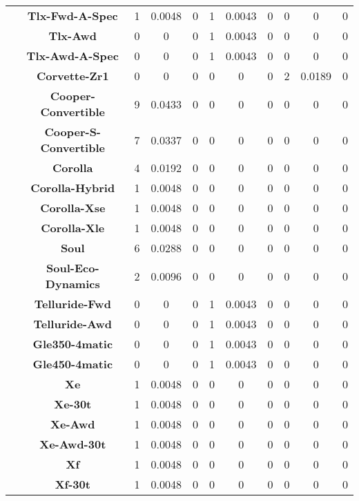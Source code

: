 \begin{center}
\begin{tabular}{|c|c||@{\hspace{1ex}}||c|c|c||@{\hspace{1ex}}||c|c|c||@{\hspace{1ex}}||c|c|c||@{\hspace{1ex}}||}
\cline{2-11}
  & {\bf Tlx-Fwd-A-Spec} & 1 & 0.0048 & 0 & 1 & 0.0043 & 0 & 0 & 0 & 0 \\
\cline{2-11}
  & {\bf Tlx-Awd} & 0 & 0 & 0 & 1 & 0.0043 & 0 & 0 & 0 & 0 \\
\cline{2-11}
  & {\bf Tlx-Awd-A-Spec} & 0 & 0 & 0 & 1 & 0.0043 & 0 & 0 & 0 & 0 \\
\cline{2-11}
  & {\bf Corvette-Zr1} & 0 & 0 & 0 & 0 & 0 & 0 & 2 & 0.0189 & 0 \\
\cline{2-11}
  & {\bf Cooper-Convertible} & 9 & 0.0433 & 0 & 0 & 0 & 0 & 0 & 0 & 0 \\
\cline{2-11}
  & {\bf Cooper-S-Convertible} & 7 & 0.0337 & 0 & 0 & 0 & 0 & 0 & 0 & 0 \\
\cline{2-11}
  & {\bf Corolla} & 4 & 0.0192 & 0 & 0 & 0 & 0 & 0 & 0 & 0 \\
\cline{2-11}
  & {\bf Corolla-Hybrid} & 1 & 0.0048 & 0 & 0 & 0 & 0 & 0 & 0 & 0 \\
\cline{2-11}
  & {\bf Corolla-Xse} & 1 & 0.0048 & 0 & 0 & 0 & 0 & 0 & 0 & 0 \\
\cline{2-11}
  & {\bf Corolla-Xle} & 1 & 0.0048 & 0 & 0 & 0 & 0 & 0 & 0 & 0 \\
\cline{2-11}
  & {\bf Soul} & 6 & 0.0288 & 0 & 0 & 0 & 0 & 0 & 0 & 0 \\
\cline{2-11}
  & {\bf Soul-Eco-Dynamics} & 2 & 0.0096 & 0 & 0 & 0 & 0 & 0 & 0 & 0 \\
\cline{2-11}
  & {\bf Telluride-Fwd} & 0 & 0 & 0 & 1 & 0.0043 & 0 & 0 & 0 & 0 \\
\cline{2-11}
  & {\bf Telluride-Awd} & 0 & 0 & 0 & 1 & 0.0043 & 0 & 0 & 0 & 0 \\
\cline{2-11}
  & {\bf Gle350-4matic} & 0 & 0 & 0 & 1 & 0.0043 & 0 & 0 & 0 & 0 \\
\cline{2-11}
  & {\bf Gle450-4matic} & 0 & 0 & 0 & 1 & 0.0043 & 0 & 0 & 0 & 0 \\
\cline{2-11}
  & {\bf Xe} & 1 & 0.0048 & 0 & 0 & 0 & 0 & 0 & 0 & 0 \\
\cline{2-11}
  & {\bf Xe-30t} & 1 & 0.0048 & 0 & 0 & 0 & 0 & 0 & 0 & 0 \\
\cline{2-11}
  & {\bf Xe-Awd} & 1 & 0.0048 & 0 & 0 & 0 & 0 & 0 & 0 & 0 \\
\cline{2-11}
  & {\bf Xe-Awd-30t} & 1 & 0.0048 & 0 & 0 & 0 & 0 & 0 & 0 & 0 \\
\cline{2-11}
  & {\bf Xf} & 1 & 0.0048 & 0 & 0 & 0 & 0 & 0 & 0 & 0 \\
\cline{2-11}
  & {\bf Xf-30t} & 1 & 0.0048 & 0 & 0 & 0 & 0 & 0 & 0 & 0 \\

\end{tabular}
\end{center}
